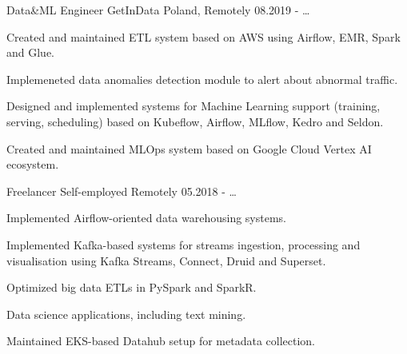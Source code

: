 

\begin{cventries}

  \cventry
    {Data\&ML Engineer} %
    {GetInData} %
    {Poland, Remotely} %
    {08.2019 - \ldots} %
    {
      \begin{cvitems} %
        \item {Created and maintained ETL system based on AWS using Airflow, EMR, Spark and Glue.}
        \item {Implemeneted data anomalies detection module to alert about abnormal traffic.}
        \item {Designed and implemented systems for Machine Learning support (training, serving, scheduling) based on Kubeflow, Airflow, MLflow, Kedro and Seldon.}
        \item {Created and maintained MLOps system based on Google Cloud Vertex AI ecosystem.}
      \end{cvitems}
    }

  \cventry
    {Freelancer} %
    {Self-employed} %
    {Remotely} %
    {05.2018 - \ldots} %
    {
      \begin{cvitems} %
        \item {Implemented Airflow-oriented data warehousing systems.}
        \item {Implemented Kafka-based systems for streams ingestion, processing and visualisation using Kafka Streams, Connect, Druid and Superset.}
        \item {Optimized big data ETLs in PySpark and SparkR.}
        \item {Data science applications, including text mining.}
        \item {Maintained EKS-based Datahub setup for metadata collection.}
      \end{cvitems}
    }


\end{cventries}
